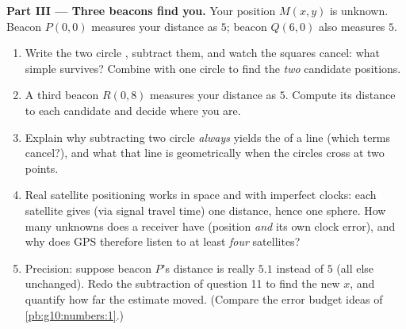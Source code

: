 \begin{problem}
\medskip
\noindent\textbf{Part III --- Three beacons find you.}
Your position $M(x, y)$ is unknown. Beacon $P(0, 0)$ measures
your distance as $5$; beacon $Q(6, 0)$ also measures $5$.
\begin{enumerate}[resume]
  \item Write the two circle , subtract them, and watch
        the squares cancel: what simple  survives?
        Combine with one circle to find the \emph{two} candidate
        positions.
  \item A third beacon $R(0, 8)$ measures your distance as $5$.
        Compute its distance to each candidate and decide where
        you are.
  \item Explain why subtracting two circle 
        \emph{always} yields the  of a line (which terms
        cancel?), and what that line is geometrically when the
        circles cross at two points.
  \item Real satellite positioning works in space and with
        imperfect clocks: each satellite gives (via signal travel
        time) one distance, hence one sphere. How many unknowns
        does a receiver have (position \emph{and} its own clock
        error), and why does GPS therefore listen to at least
        \emph{four} satellites?
  \item Precision: suppose beacon $P$'s distance is really
        $5.1$ instead of $5$ (all else unchanged). Redo the
        subtraction of question 11 to find the new $x$, and
        quantify how far the estimate moved. (Compare the error
        budget ideas of \cref{pb:g10:numbers:1}.)
\end{enumerate}


\end{problem}
